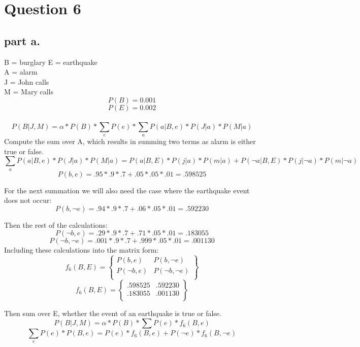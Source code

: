 \section{Question 6}

\subsection{part a.}
B = burglary 
E = earthquake \\
A = alarm \\
J = John calls \\
M = Mary calls \\
\[P(B) = 0.001 \]
\[P(E) = 0.002\] \\
\[P(B | J,M) = \alpha * P(B) * \sum_e{P(e) * \sum_a{P(a|B,e) * P(J|a) * P(M|a)}}
\]
Compute the sum over A, which results in summing two terms as alarm is either true or false.
\[\sum_{a}{P(a|B,e) * P(J|a) * P(M|a)} =
P(a|B,E)*P(j|a) * P(m|a) + P(\neg a|B,E) * P(j|\neg a)*P(m|\neg a)
\]
\[P(b, e) = .95 * .9 * .7 + .05 * .05 * .01 = .598525
\]

For the next summation we will also need the case where the earthquake event does not occur:
\[P(b,\neg e) = .94 * .9 * .7 + .06 * .05 * .01 = .592230
\]

Then the rest of the calculations:
\[P(\neg b, e) = .29 * .9 * .7 + .71 * .05 * .01 = .183055
\]
\[P(\neg b,\neg e) = .001 * .9 * .7 + .999 * .05 * .01 = .001130
\]
Including these calculations into the matrix form:
\[
f_6(B,E) = \begin{Bmatrix}
P(b,e) & P(b, \neg e) \\
P(\neg b, e) & P(\neg b, \neg e) \\
\end{Bmatrix}
\]
\[
f_6(B,E) = \begin{Bmatrix}
.598525 & .592230 \\
.183055 & .001130 \\
\end{Bmatrix}
\]

Then sum over E, whether the event of an earthquake is true or false.
\[ P(B | J, M) = \alpha * P(B) * \sum{P(e) * f_6(B,e)}
\]
\[
\sum_e{P(e) * P(B,e)} = P(e)* f_6(B,e) + P(\neg e) * f_6(B, \neg e)
\]

